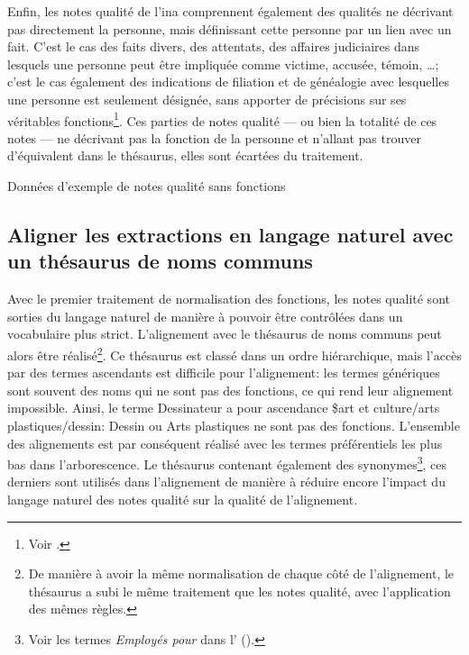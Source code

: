 Enfin, les notes qualité de l'\ac{ina} comprennent également des qualités ne décrivant pas directement la personne, mais définissant cette personne par un lien avec un fait. C'est le cas des faits divers, des attentats, des affaires judiciaires dans lesquels une personne peut être impliquée comme victime, accusée, témoin, \dots; c'est le cas également des indications de filiation et de généalogie avec lesquelles une personne est seulement désignée, sans apporter de précisions sur ses véritables fonctions\footnote{Voir .}. Ces parties de notes qualité --- ou bien la totalité de ces notes --- ne décrivant pas la fonction de la personne et n'allant pas trouver d'équivalent dans le thésaurus, elles sont écartées du traitement.
\begin{table}[!h]
	\centering
	\caption{Données d'exemple de notes qualité sans fonctions}
	\label{exemple_NQ_sans_fonctions}
\end{table}

\subsection{\label{I-C-3-b}Aligner les extractions en langage naturel avec un thésaurus de noms communs}

Avec le premier traitement de normalisation des fonctions, les notes qualité sont sorties du langage naturel de manière à pouvoir être contrôlées dans un vocabulaire plus strict. L'alignement avec le thésaurus de noms communs peut alors être réalisé\footnote{De manière à avoir la même normalisation de chaque côté de l'alignement, le thésaurus a subi le même traitement que les notes qualité, avec l'application des mêmes règles.}. Ce thésaurus est classé dans un ordre hiérarchique, mais l'accès par des termes ascendants est difficile pour l'alignement: les termes génériques sont souvent des noms qui ne sont pas des fonctions, ce qui rend leur alignement impossible. Ainsi, le terme \og Dessinateur\fg{} a pour ascendance \og \$art et culture/arts plastiques/dessin\fg{}: \og Dessin\fg{} ou \og Arts plastiques\fg{} ne sont pas des fonctions. L'ensemble des alignements est par conséquent réalisé avec les termes préférentiels les plus bas dans l'arborescence. Le thésaurus contenant également des synonymes\footnote{Voir les termes \textit{Employés pour} dans l' ().}, ces derniers sont utilisés dans l'alignement de manière à réduire encore l'impact du langage naturel des notes qualité sur la qualité de l'alignement.\\

